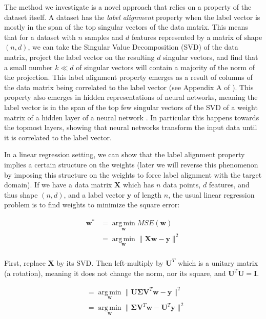 \documentclass[twoside,11pt]{article}
\begin{document}
The method we investigate is a novel approach that relies on a property of the dataset itself. A dataset has the \emph{label alignment} property when the label vector is mostly in the span of the top singular vectors of the data matrix. This means that for a dataset with $n$ samples and $d$ features represented by a matrix of shape $(n, d)$, we can take the Singular Value Decomposition (SVD) of the data matrix, project the label vector on the resulting $d$ singular vectors, and find that a small number $k \ll d$ of singular vectors will contain a majority of the norm of the projection. This label alignment property emerges as a result of columns of the data matrix being correlated to the label vector (see Appendix A of \cite{imani2022label}). This property also emerges in hidden representations of neural networks, meaning the label vector is in the span of the top few singular vectors of the SVD of a weight matrix of a hidden layer of a neural network \cite{imani2022representation}. In particular this happens towards the topmost layers, showing that neural networks transform the input data until it is correlated to the label vector. 

In a linear regression setting, we can show that the label alignment property implies a certain structure on the weights (later we will reverse this phenomenon by imposing this structure on the weights to force label alignment with the target domain). If we have a data matrix $\mathbf{X}$ which has $n$ data points, $d$ features, and thus shape $(n,d)$, and a label vector $\mathbf{y}$ of length $n$, the usual linear regression problem is to find weights to minimize the square error:

$$
\begin{aligned}
\mathbf{w}^* &= \operatorname*{arg\,min}_{\mathbf{w}} MSE(\mathbf{w}) \\
&= \operatorname*{arg\,min}_{\mathbf{w}} \lVert \mathbf{X} \mathbf{w} - \mathbf{y} \rVert^2 \\
\end{aligned}
$$

First, replace $\mathbf{X}$ by its SVD. Then left-multiply by $\mathbf{U}^T$ which is a unitary matrix (a rotation), meaning it does not change the norm, nor its square, and $\mathbf{U}^T \mathbf{U} = \mathbf{I}$. 

$$
\begin{aligned}
&= \operatorname*{arg\,min}_{\mathbf{w}} \lVert \mathbf{U \Sigma V}^T \mathbf{w} - \mathbf{y} \rVert^2 \\
&= \operatorname*{arg\,min}_{\mathbf{w}} \lVert \mathbf{\Sigma V}^T \mathbf{w} - \mathbf{U}^T \mathbf{y} \rVert^2 \\
\end{aligned}
$$
\end{document}
